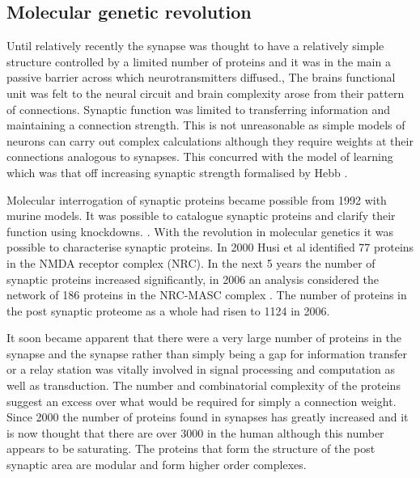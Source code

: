 \subsection{Molecular genetic revolution}
 Until relatively recently the synapse was thought to have a relatively simple structure controlled by a limited number of proteins and it was in the main a passive barrier across which neurotransmitters diffused.\cite{grant2019synapse}, \cite{lisman1994cam}  The brains functional unit was felt to the neural circuit and brain complexity arose from their pattern of connections. Synaptic function was limited to transferring information and maintaining a connection strength. This is not unreasonable as simple models of neurons can carry out complex calculations although they require weights at their connections analogous to synapses. This concurred with the model of learning which was that off increasing synaptic strength formalised by Hebb \cite{hebb1949organization_check}. 
 
 Molecular interrogation of synaptic proteins became possible from 1992 with murine models. It was possible to catalogue synaptic proteins and clarify their function using knockdowns.  \cite{grant1992impaired}\cite{silva1992impaired}.  With the revolution in molecular genetics it was possible to characterise synaptic proteins. In 2000 Husi et al \cite{husi2000proteomic} identified 77 proteins in the NMDA receptor complex (NRC). In the next 5 years the number of synaptic proteins increased significantly, in 2006 an analysis considered the network of 186 proteins in the NRC-MASC complex \cite{pocklington2006proteomes}. The number of proteins in the post synaptic proteome as a whole had risen to 1124 in 2006\cite{collins2006molecular}.
 
 It soon became apparent that there were a very large number of proteins in the synapse and the synapse rather than simply being a gap for information transfer or a relay station was vitally involved in signal processing and computation as well as transduction. The number and combinatorial complexity of the proteins suggest an excess over what would be required for simply a connection weight.  Since 2000 the number of proteins found in synapses has greatly increased and it is now thought that there are over 3000 in the human although this number appears to be saturating. \cite{heil2018systems}  The proteins that form the structure of the post synaptic area are modular and form higher order complexes\cite{pocklington2006proteomes}\cite{zhu2016mechanistic}\cite{frank2016nmda}.

